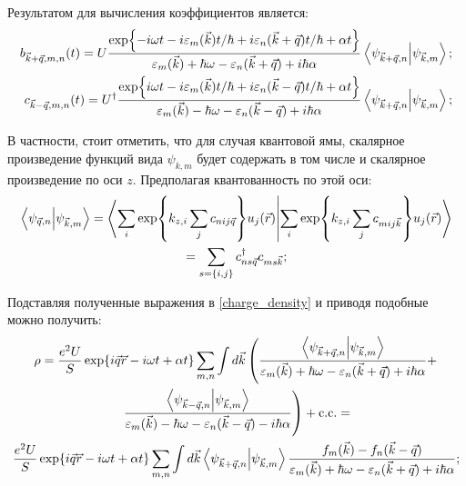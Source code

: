 \documentclass[../main.tex]{subfiles}
\begin{document}
    Результатом для вычисления коэффициентов является:
    \begin{equation}
        \label{plasmons:charge:coeffs}
        \begin{aligned}
            b_{\vec k + \vec q, m, n} (t) = U \frac{\exp{-i\omega t - i 
                \varepsilon_m (\vec k) t / \hbar + i \varepsilon_n(\vec k 
                + \vec q) t / \hbar + \alpha t}}{\varepsilon_m (\vec k) + \hbar 
                \omega - \varepsilon_n(\vec k + \vec q)+ i \hbar \alpha}
                \bra{\psi_{\vec k+\vec q, n}}\ket{\psi_{\vec k, m}}; \\
            c_{\vec k - \vec q, m, n} (t) = U^\dagger \frac{\exp{i\omega t - i 
                \varepsilon_m (\vec k) t / \hbar + i \varepsilon_n(\vec k 
                - \vec q) t / \hbar + \alpha t}}{\varepsilon_m (\vec k) - \hbar 
                \omega - \varepsilon_n(\vec k - \vec q)+ i \hbar \alpha}
                \bra{\psi_{\vec k+\vec q, n}}\ket{\psi_{\vec k, m}};
        \end{aligned}
    \end{equation}

    В частности, стоит отметить, что для случая квантовой ямы, скалярное 
    произведение функций вида $\psi_{k, m}$ будет содержать в том числе 
    и скалярное произведение по оси $z$. Предполагая квантованность по 
    этой оси:
    \begin{multline}
        \bra{\psi_{\vec q, n}}\ket{\psi_{\vec k, m}} = 
            \bra{\sum_i \exp{k_{z,i} \sum_j c_{nij \vec q}} u_j(\vec r)}
            \ket{\sum_i \exp{k_{z,i} \sum_j c_{mij \vec k}} u_j(\vec r)}\\ 
            = \sum_{s=\{i,j\}}  c^\dagger_{ns \vec q} c_{ms \vec k};
    \end{multline}

    Подставляя полученные выражения в \ref{charge_density} 
    и приводя подобные можно получить:
    \begin{multline}
        \rho = \frac{e^2 U}{S} \exp{i\vec q \vec r - i \omega t + \alpha t}
            \sum_{m, n} \int d\vec k \left( \frac{\bra{\psi_{\vec k + \vec q, n}}
            \ket{\psi_{\vec k, m}}}{\varepsilon_m(\vec k) + \hbar \omega - 
            \varepsilon_n(\vec k + \vec q) + i \hbar \alpha} +\right. \\ 
            \left. \frac{\bra{\psi_{\vec k - \vec q, n}}
            \ket{\psi_{\vec k, m}}}{\varepsilon_m(\vec k) - \hbar \omega - 
            \varepsilon_n(\vec k - \vec q) - i \hbar \alpha} \right) + \text{c.c.}=\\
            \frac{e^2 U}{S} \exp{i\vec q \vec r - i \omega t + \alpha t}
            \sum_{m, n} \int d\vec k \bra{\psi_{\vec k + \vec q, n}}
            \ket{\psi_{\vec k, m}} \frac{f_m(\vec k) - f_n(\vec k - \vec q)}
            {\varepsilon_m(\vec k) + \hbar \omega - \varepsilon_n(\vec k + \vec q) 
            + i \hbar \alpha};
    \end{multline}
\end{document}
